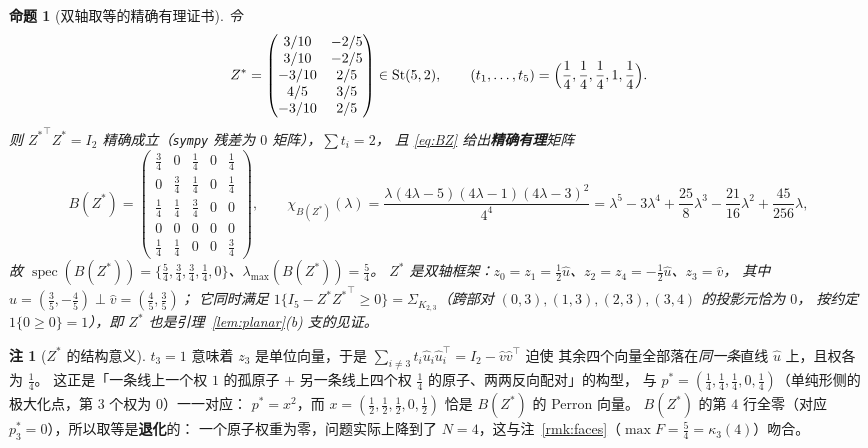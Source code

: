 \documentclass[UTF8,11pt]{ctexart}
\newtheorem{proposition}[theorem]{命题}
\theoremstyle{definition}
\newtheorem{remark}[theorem]{注}
\begin{document}
\begin{proposition}[双轴取等的精确有理证书]\label{prop:biaxsharp}
令
\[
Z^\ast=\begin{pmatrix}3/10&-2/5\\ 3/10&-2/5\\ -3/10&2/5\\ 4/5&3/5\\ -3/10&2/5\end{pmatrix}\in\mathrm{St}(5,2),
\qquad (t_1,\dots,t_5)=\Bigl(\frac14,\frac14,\frac14,1,\frac14\Bigr).
\]
则 ${Z^\ast}^\top Z^\ast=I_2$ 精确成立（\texttt{sympy} 残差为 $0$ 矩阵），$\sum t_i=2$，
且 \eqref{eq:BZ} 给出\textbf{精确有理}矩阵
\[
B(Z^\ast)=\begin{pmatrix}
\frac34&0&\frac14&0&\frac14\\[1pt]
0&\frac34&\frac14&0&\frac14\\[1pt]
\frac14&\frac14&\frac34&0&0\\[1pt]
0&0&0&0&0\\[1pt]
\frac14&\frac14&0&0&\frac34
\end{pmatrix},\qquad
\chi_{B(Z^\ast)}(\lambda)=\frac{\lambda(4\lambda-5)(4\lambda-1)(4\lambda-3)^2}{4^{4}}
=\lambda^5-3\lambda^4+\frac{25}8\lambda^3-\frac{21}{16}\lambda^2+\frac{45}{256}\lambda,
\]
故 $\operatorname{spec}(B(Z^\ast))=\{\frac54,\frac34,\frac34,\frac14,0\}$、$\lambda_{\max}(B(Z^\ast))=\frac54$。
$Z^\ast$ 是双轴框架：$z_0=z_1=\frac12\hat u$、$z_2=z_4=-\frac12\hat u$、$z_3=\hat v$，
其中 $\hat u=(\frac35,-\frac45)\perp\hat v=(\frac45,\frac35)$；
它同时满足 $1\{I_5-Z^\ast{Z^\ast}^\top\ge0\}=\Sigma_{K_{2,3}}$（跨部对 $(0,3),(1,3),(2,3),(3,4)$ 的投影元\emph{恰为} $0$，
按约定 $1\{0\ge0\}=1$），即 $Z^\ast$ 也是引理~\ref{lem:planar}(b) 支的见证。
\end{proposition}

\begin{remark}[$Z^\ast$ 的结构意义]\label{rmk:zstar}
$t_3=1$ 意味着 $z_3$ 是单位向量，于是 $\sum_{i\ne3}t_i\hat u_i\hat u_i^\top=I_2-\hat v\hat v^\top$ 迫使
其余四个向量全部落在\emph{同一条}直线 $\hat u$ 上，且权各为 $\frac14$。
这正是「一条线上一个权 $1$ 的孤原子 $+$ 另一条线上四个权 $\frac14$ 的原子、两两反向配对」的构型，
与 $p^\ast=(\frac14,\frac14,\frac14,0,\frac14)$（单纯形侧的极大化点，第 $3$ 个权为 $0$）一一对应：
$p^\ast=x^2$，而 $x=(\frac12,\frac12,\frac12,0,\frac12)$ 恰是 $B(Z^\ast)$ 的 Perron 向量。
$B(Z^\ast)$ 的第 $4$ 行全零（对应 $p^\ast_3=0$），所以取等是\textbf{退化}的：
一个原子权重为零，问题实际上降到了 $N=4$，这与注~\ref{rmk:faces}（$\max F=\frac54=\kappa_3(4)$）吻合。
\end{remark}
\end{document}

